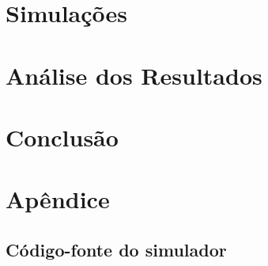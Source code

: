 \documentclass[]{article}
\begin{document}
\section{Simulações}

\section{Análise dos Resultados}

\section{Conclusão}

\appendix
\section{Apêndice}
\subsection{Código-fonte do simulador}
\end{document}
